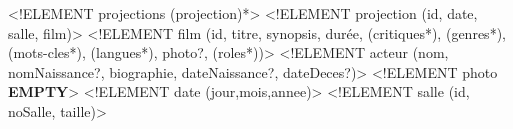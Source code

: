 \documentclass[]{article}
\newenvironment{Shaded}{}{}
\newcommand{\KeywordTok}[1]{\textcolor[rgb]{0.00,0.44,0.13}{\textbf{{#1}}}}
\newcommand{\DataTypeTok}[1]{\textcolor[rgb]{0.56,0.13,0.00}{{#1}}}
\newcommand{\DecValTok}[1]{\textcolor[rgb]{0.25,0.63,0.44}{{#1}}}
\newcommand{\FloatTok}[1]{\textcolor[rgb]{0.25,0.63,0.44}{{#1}}}
\newcommand{\FunctionTok}[1]{\textcolor[rgb]{0.02,0.16,0.49}{{#1}}}
\newcommand{\NormalTok}[1]{{#1}}
\begin{document}
\begin{Shaded}
\begin{Highlighting}[]
\DataTypeTok{<!ELEMENT} \FunctionTok{projections} \DecValTok{(}\FunctionTok{projection}\DecValTok{)}\FloatTok{*}\DataTypeTok{>}
\DataTypeTok{<!ELEMENT} \FunctionTok{projection} \DecValTok{(}\FunctionTok{id}\DecValTok{,} \FunctionTok{date}\DecValTok{,} \FunctionTok{salle}\DecValTok{,} \FunctionTok{film}\DecValTok{)}\DataTypeTok{>}
\DataTypeTok{<!ELEMENT} \FunctionTok{film} \DecValTok{(}\FunctionTok{id}\DecValTok{,} \FunctionTok{titre}\DecValTok{,} \FunctionTok{synopsis}\DecValTok{,} \FunctionTok{dur}\NormalTok{é}\FunctionTok{e}\DecValTok{,} \DecValTok{(}\FunctionTok{critiques}\FloatTok{*}\DecValTok{),} \DecValTok{(}\FunctionTok{genres}\FloatTok{*}\DecValTok{),} \DecValTok{(}\FunctionTok{mots-cles}\FloatTok{*}\DecValTok{),} \DecValTok{(}\FunctionTok{langues}\FloatTok{*}\DecValTok{),} \FunctionTok{photo}\FloatTok{?}\DecValTok{,} \DecValTok{(}\FunctionTok{roles}\FloatTok{*}\DecValTok{))}\DataTypeTok{>}
\DataTypeTok{<!ELEMENT} \FunctionTok{acteur} \DecValTok{(}\FunctionTok{nom}\DecValTok{,} \FunctionTok{nomNaissance}\FloatTok{?}\DecValTok{,} \FunctionTok{biographie}\DecValTok{,} \FunctionTok{dateNaissance}\FloatTok{?}\DecValTok{,} \FunctionTok{dateDeces}\FloatTok{?}\DecValTok{)}\DataTypeTok{>}
\DataTypeTok{<!ELEMENT} \FunctionTok{photo} \KeywordTok{EMPTY}\DataTypeTok{>}
\DataTypeTok{<!ELEMENT} \FunctionTok{date} \DecValTok{(}\FunctionTok{jour}\DecValTok{,}\FunctionTok{mois}\DecValTok{,}\FunctionTok{annee}\DecValTok{)}\DataTypeTok{>}
\DataTypeTok{<!ELEMENT} \FunctionTok{salle} \DecValTok{(}\FunctionTok{id}\DecValTok{,} \FunctionTok{noSalle}\DecValTok{,} \FunctionTok{taille}\DecValTok{)}\DataTypeTok{>}


\end{Highlighting}
\end{Shaded}
\end{document}
